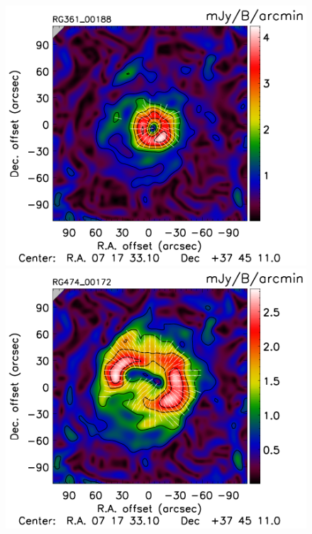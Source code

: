 \documentclass[twocolumn,traditabstract]{aa}
\begin{document}
\begin{figure}[h]
\includegraphics[trim=0cm 0.7cm 0cm 0cm, clip=true, totalheight=3.7cm]{Figure/Grad_RG361_00188_Ymap_zobs0p6_processed_15_15_45.pdf}
\includegraphics[trim=0cm 0.7cm 0cm 0cm, clip=true, totalheight=3.7cm]{Figure/Grad_RG474_00172_Ymap_zobs0p9_processed_15_15_45.pdf}

\end{figure}
\end{document}
